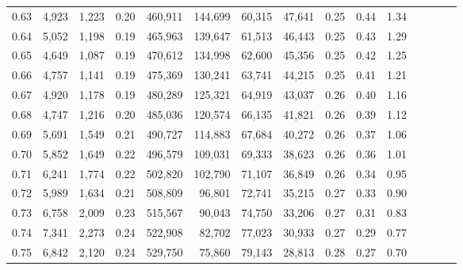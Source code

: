 \begin{tabular}{rrrcrrrrrrrrrrr}
0.63 &   4,923 &  1,223 &                                       0.20 &  460,911 &  144,699 &   60,315 &   47,641 &  0.25 &  0.44 &                         1.34 \\
0.64 &   5,052 &  1,198 &                                       0.19 &  465,963 &  139,647 &   61,513 &   46,443 &  0.25 &  0.43 &                         1.29 \\
0.65 &   4,649 &  1,087 &                                       0.19 &  470,612 &  134,998 &   62,600 &   45,356 &  0.25 &  0.42 &                         1.25 \\
0.66 &   4,757 &  1,141 &                                       0.19 &  475,369 &  130,241 &   63,741 &   44,215 &  0.25 &  0.41 &                         1.21 \\
0.67 &   4,920 &  1,178 &                                       0.19 &  480,289 &  125,321 &   64,919 &   43,037 &  0.26 &  0.40 &                         1.16 \\
0.68 &   4,747 &  1,216 &                                       0.20 &  485,036 &  120,574 &   66,135 &   41,821 &  0.26 &  0.39 &                         1.12 \\
0.69 &   5,691 &  1,549 &                                       0.21 &  490,727 &  114,883 &   67,684 &   40,272 &  0.26 &  0.37 &                         1.06 \\
0.70 &   5,852 &  1,649 &                                       0.22 &  496,579 &  109,031 &   69,333 &   38,623 &  0.26 &  0.36 &                         1.01 \\
0.71 &   6,241 &  1,774 &                                       0.22 &  502,820 &  102,790 &   71,107 &   36,849 &  0.26 &  0.34 &                         0.95 \\
0.72 &   5,989 &  1,634 &                                       0.21 &  508,809 &   96,801 &   72,741 &   35,215 &  0.27 &  0.33 &                         0.90 \\
0.73 &   6,758 &  2,009 &                                       0.23 &  515,567 &   90,043 &   74,750 &   33,206 &  0.27 &  0.31 &                         0.83 \\
0.74 &   7,341 &  2,273 &                                       0.24 &  522,908 &   82,702 &   77,023 &   30,933 &  0.27 &  0.29 &                         0.77 \\
0.75 &   6,842 &  2,120 &                                       0.24 &  529,750 &   75,860 &   79,143 &   28,813 &  0.28 &  0.27 &                         0.70 \\

\end{tabular}
